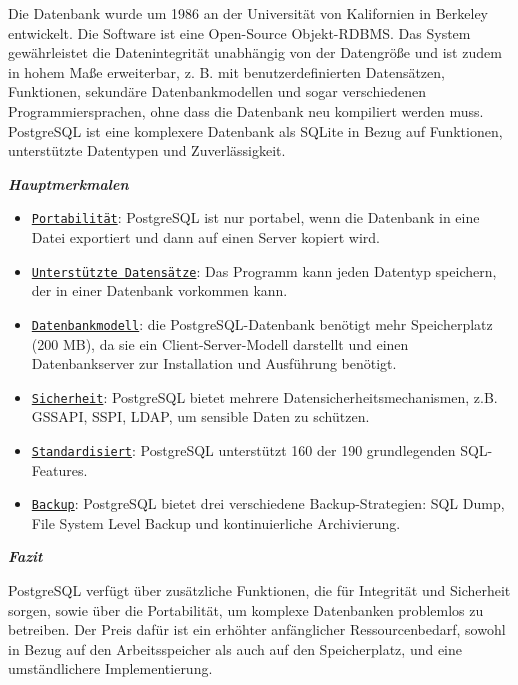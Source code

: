 Die Datenbank wurde um 1986 an der Universität von Kalifornien in Berkeley entwickelt.
Die Software ist eine Open-Source Objekt-RDBMS. Das System gewährleistet die Datenintegrität 
unabhängig von der Datengröße und ist zudem in hohem Maße erweiterbar, z. B. mit benutzerdefinierten
Datensätzen, Funktionen, sekundäre Datenbankmodellen und sogar verschiedenen Programmiersprachen, 
ohne dass die Datenbank neu kompiliert werden muss. PostgreSQL ist eine komplexere Datenbank als
SQLite in Bezug auf Funktionen, unterstützte Datentypen und Zuverlässigkeit. \cite{PostgreSQL_About}

\begin{large} \emph{\textbf{Hauptmerkmalen}} \end{large}
\begin{itemize}
    \item \underline{\texttt{Portabilität}}:
        PostgreSQL ist nur portabel, wenn die Datenbank in eine Datei exportiert und dann
        auf einen Server kopiert wird. \cite{SQLite_vs_PostgreSQL}
    \item \underline{\texttt{Unterstützte Datensätze}}:
        Das Programm kann jeden Datentyp speichern, der in einer Datenbank vorkommen
        kann. \cite{SQLite_vs_PostgreSQL}
    \item \underline{\texttt{Datenbankmodell}}:
        die PostgreSQL-Datenbank benötigt mehr Speicherplatz (200 MB), da sie ein 
        Client-Server-Modell darstellt und einen Datenbankserver zur Installation und 
        Ausführung benötigt.\cite{SQLite_vs_PostgreSQL}
    \item \underline{\texttt{Sicherheit}}:
        PostgreSQL bietet mehrere Datensicherheitsmechanismen, z.B. GSSAPI, SSPI, LDAP, 
        um sensible Daten zu schützen.\cite{PostgreSQL_Authentication}
    \item \underline{\texttt{Standardisiert}}:
         PostgreSQL unterstützt 160 der 190 grundlegenden SQL-Features.\cite{PostgreSQL_standardisierung}
    \item \underline{\texttt{Backup}}:
        PostgreSQL bietet drei verschiedene Backup-Strategien: SQL Dump, File System 
        Level Backup und kontinuierliche Archivierung.\cite{PostgreSQL_Backup}
\end{itemize} 
\begin{large} \emph{\textbf{Fazit}} \end{large}
PostgreSQL verfügt über zusätzliche Funktionen, die für Integrität und Sicherheit sorgen,
sowie über die Portabilität, um komplexe Datenbanken problemlos zu betreiben. Der Preis
dafür ist ein erhöhter anfänglicher Ressourcenbedarf, sowohl in Bezug auf den 
Arbeitsspeicher als auch auf den Speicherplatz, und eine umständlichere Implementierung. 